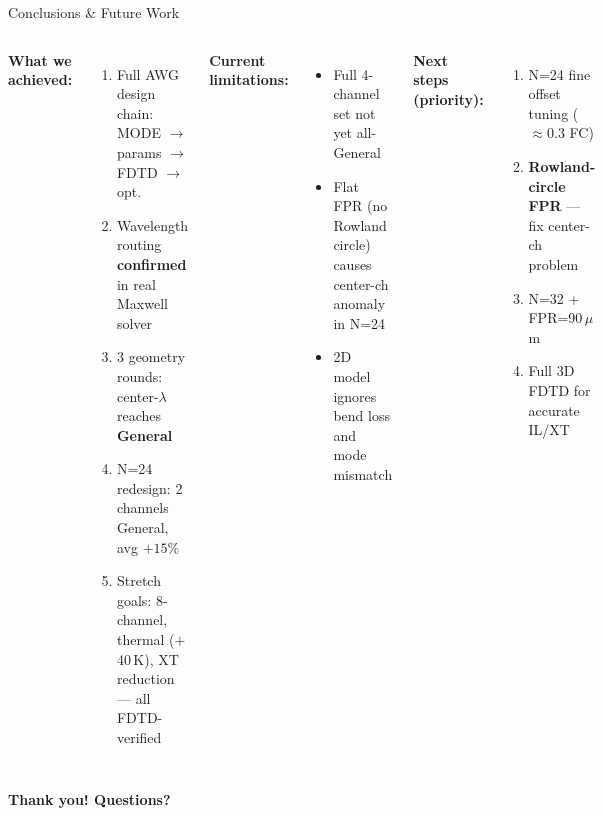 \documentclass[aspectratio=169,10pt]{beamer}
\begin{document}
\begin{frame}{Conclusions \& Future Work}
  \begin{columns}[T]
      \textbf{What we achieved:}
      \begin{enumerate}\small\setlength\itemsep{3pt}
        \item Full AWG design chain: MODE $\to$ params $\to$ FDTD $\to$ opt.
        \item Wavelength routing \textbf{confirmed} in real Maxwell solver
        \item 3 geometry rounds: center-$\lambda$ reaches \textbf{General}
        \item N=24 redesign: 2 channels General, avg $+15\%$
        \item Stretch goals: 8-channel, thermal ($+$40\,K), XT reduction — all FDTD-verified
      \end{enumerate}

      \textbf{Current limitations:}
      \begin{itemize}\small\setlength\itemsep{3pt}
        \item Full 4-channel set not yet all-General
        \item Flat FPR (no Rowland circle) causes center-ch anomaly in N=24
        \item 2D model ignores bend loss and mode mismatch
      \end{itemize}
      \vspace{5pt}
      \textbf{Next steps (priority):}
      \begin{enumerate}\small\setlength\itemsep{2pt}
        \item N=24 fine offset tuning ($\approx$0.3 FC)
        \item \textbf{Rowland-circle FPR} — fix center-ch problem
        \item N=32 + FPR=90\,$\mu$m
        \item Full 3D FDTD for accurate IL/XT
      \end{enumerate}
  \end{columns}
  \vspace{6pt}
  \begin{center}\large\textbf{Thank you! Questions?}\end{center}
\end{frame}
\end{document}
